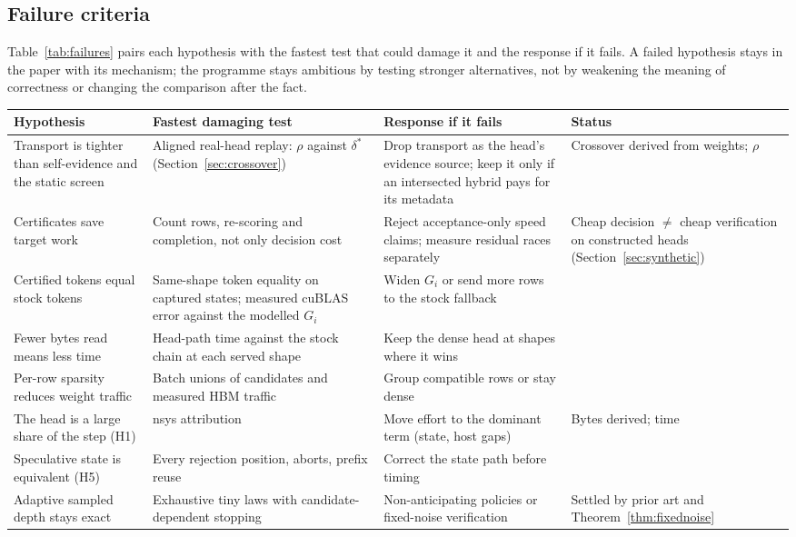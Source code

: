 \subsection{Failure criteria}
Table~\ref{tab:failures} pairs each hypothesis with the fastest test that could damage it and the response if it fails. A failed hypothesis stays in the paper with its mechanism; the programme stays ambitious by testing stronger alternatives, not by weakening the meaning of correctness or changing the comparison after the fact.

\begin{longtable}{@{}P{3.1cm}P{4.1cm}P{4.3cm}P{2.6cm}@{}}
\toprule Hypothesis & Fastest damaging test & Response if it fails & Status\\\midrule\endhead
Transport is tighter than self-evidence and the static screen & Aligned real-head replay: $\rho$ against $\delta^\ast$ (Section~\ref{sec:crossover}) & Drop transport as the head's evidence source; keep it only if an intersected hybrid pays for its metadata & Crossover derived from weights; $\rho$ \pending{}\\
Certificates save target work & Count rows, re-scoring and completion, not only decision cost & Reject acceptance-only speed claims; measure residual races separately & Cheap decision $\ne$ cheap verification on constructed heads (Section~\ref{sec:synthetic})\\
Certified tokens equal stock tokens & Same-shape token equality on captured states; measured cuBLAS error against the modelled $G_i$ & Widen $G_i$ or send more rows to the stock fallback & \pending{}\\
Fewer bytes read means less time & Head-path time against the stock chain at each served shape & Keep the dense head at shapes where it wins & \pending{}\\
Per-row sparsity reduces weight traffic & Batch unions of candidates and measured HBM traffic & Group compatible rows or stay dense & \pending{}\\
The head is a large share of the step (H1) & nsys attribution & Move effort to the dominant term (state, host gaps) & Bytes derived; time \pending{}\\
Speculative state is equivalent (H5) & Every rejection position, aborts, prefix reuse & Correct the state path before timing & \pending{}\\
Adaptive sampled depth stays exact & Exhaustive tiny laws with candidate-dependent stopping & Non-anticipating policies or fixed-noise verification & Settled by prior art and Theorem~\ref{thm:fixednoise}\\

\end{longtable}
